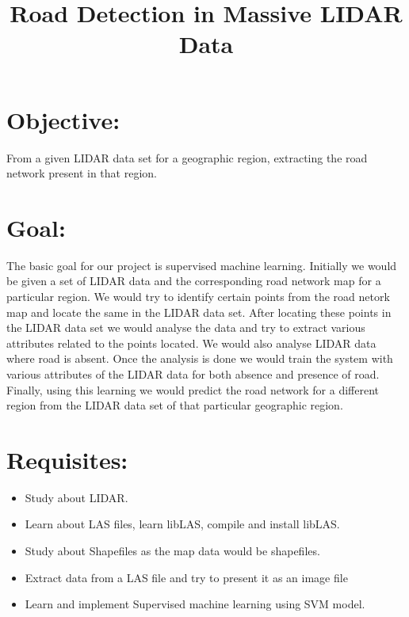 \documentclass[12pt,letterpaper]{article}
\begin{document}
\title{Road Detection in Massive LIDAR Data}
\maketitle

\section{Objective:}
From a given LIDAR data set for a geographic region, extracting the road network present in that region.

\section{Goal:} 
The basic goal for our project is supervised machine learning. Initially we would be given a set of LIDAR data and the corresponding road network map for a particular region. We would try to identify certain points from the road netork map and locate the same in the LIDAR data set. After locating these points in the LIDAR data set we would analyse the data and try to extract various attributes related to the points located. We would also analyse LIDAR data where road is absent. Once the analysis is done we would train the system with various attributes of the LIDAR data for both absence and presence of road. Finally, using this learning we would predict the road network for a different region from the LIDAR data set of that particular geographic region.

\section{Requisites:}
\begin{itemize}
\item Study about LIDAR.
\item Learn about LAS files, learn libLAS, compile and install libLAS.
\item Study about Shapefiles as the map data would be shapefiles.
\item Extract data from a LAS file and try to present it as an image file
\item Learn and implement Supervised machine learning using SVM model.
\end{itemize}
\end{document}
